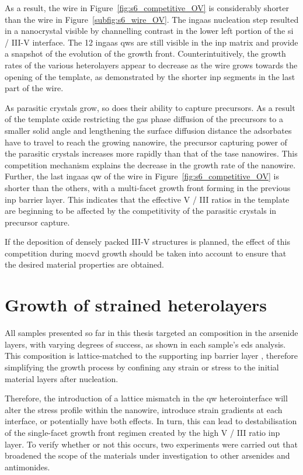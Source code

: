 As a result, the wire in Figure~\ref{fig:s6_competitive_OV} is considerably shorter than the wire in Figure~\ref{subfig:s6_wire_OV}. The \acs{ingaas} nucleation step resulted in a nanocrystal visible by channelling contrast in the lower left portion of the \acs{si} / III-V interface. The \num{12} \acs{ingaas} \acl{qw}s are still visible in the \acs{inp} matrix and provide a snapshot of the evolution of the growth front. Counterintuitively, the growth rates of the various heterolayers appear to decrease as the wire grows towards the opening of the template, as demonstrated by the shorter \acs{inp} segments in the last part of the wire. 

As parasitic crystals grow, so does their ability to capture precursors. As a result of the template oxide restricting the gas phase diffusion of the precursors to a smaller solid angle and lengthening the surface diffusion distance the adsorbates have to travel to reach the growing nanowire, the precursor capturing power of the parasitic crystals increases more rapidly than that of the \acs{tase} nanowires. This competition mechanism explains the decrease in the growth rate of the nanowire. Further, the last \acs{ingaas} \acl{qw} of the wire in Figure~\ref{fig:s6_competitive_OV} is shorter than the others, with a multi-facet growth front forming in the previous \acs{inp} barrier layer. This indicates that the effective V / III ratios in the template are beginning to be affected by the competitivity of the parasitic crystals in precursor capture.

If the deposition of densely packed III-V structures is planned, the effect of this competition during \acs{mocvd} growth should be taken into account to ensure that the desired material properties are obtained.

\section{Growth of strained heterolayers}

All samples presented so far in this thesis targeted an  composition in the arsenide layers, with varying degrees of success, as shown in each sample's \acs{eds} analysis. This composition is lattice-matched to the supporting \acs{inp} barrier layer \cite{Pearsall1980, Sugii1983, Wagner1970}, therefore simplifying the growth process by confining any strain or stress to the initial material layers after nucleation.

Therefore, the introduction of a lattice mismatch in the \acl{qw} heterointerface will alter the stress profile within the nanowire, introduce strain gradients at each interface, or potentially have both effects. In turn, this can lead to destabilisation of the  single-facet growth front regimen created by the high V / III ratio \acs{inp} layer. To verify whether or not this occurs, two experiments were carried out that broadened the scope of the materials under investigation to other arsenides and antimonides. 

